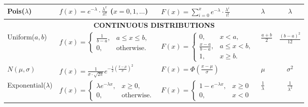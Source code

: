 \documentclass[11pt,a4paper,english]{article} %
\begin{document}
{\begin{center}
\begin{tabular}{m{}m{}m{}m{}c}
                Pois($\lambda$) & $f(x) = e^{-\lambda}\cdot \frac{\lambda^x}{x!}$ \newline ($x = 0, 1, \ldots$) & $F(x) = \sum\limits_{i=0}^x e^{-\lambda} \cdot \frac{\lambda^i}{i!}$ & $\lambda$ & $\lambda$ \\ 
            \midrule
                \multicolumn{5}{c}{\textbf{CONTINUOUS DISTRIBUTIONS}} \\ 
            \midrule
                Uniform($a, b$) & $f(x) = \begin{cases} \frac{1}{b-a}, & a \leq x \leq b, \\ 0, & \text{otherwise.} \end{cases}$ & $F(x) = \begin{cases} 
                0, & x < a, \\
                \frac{x-a}{b-a}, & a \leq x < b, \\ 1, & x \geq b. \end{cases}$ & $\frac{a+b}{2}$ & $\frac{(b-a)^2}{12}$ \\ \midrule
                $N(\mu, \sigma)$ & $f(x) = \frac{1}{\sigma\cdot\sqrt{2\pi}} e^{-\frac{1}{2}\left(\frac{x-\mu}{\sigma}\right)^2}$ & $F(x) = \Phi\left(\frac{x-\mu}{\sigma}\right)$ & $\mu$ & $\sigma^2$ \\ \midrule
                Exponential($\lambda$) & $f(x) = \begin{cases} \lambda e^{-\lambda x}, & x \geq 0, \\ 0, & \text{otherwise.} \end{cases}$ & $F(x) = \begin{cases} 1 - e^{-\lambda x}, & x \geq 0 \\ 0, & x < 0 \end{cases}$ & $\frac{1}{\lambda}$ & $\frac{1}{\lambda^2}$ \\ 
            \bottomrule
        \end{tabular}
    \end{center}
}
\end{document}
